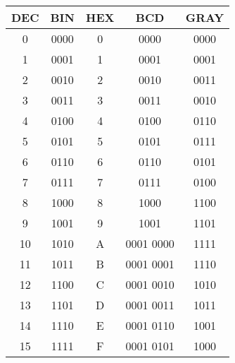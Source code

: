 \begin{multicols}{3}
        \begin{tabular}{|c|c|c|c|c|}
        \hline
        \textbf{DEC} & \textbf{BIN} & \textbf{HEX} & \textbf{BCD} & \textbf{GRAY} \\ \hline
        0            & 0000         & 0            & 0000         & 0000          \\ \hline
        1            & 0001         & 1            & 0001         & 0001          \\ \hline
        2            & 0010         & 2            & 0010         & 0011          \\ \hline
        3            & 0011         & 3            & 0011         & 0010          \\ \hline
        4            & 0100         & 4            & 0100         & 0110          \\ \hline
        5            & 0101         & 5            & 0101         & 0111          \\ \hline
        6            & 0110         & 6            & 0110         & 0101          \\ \hline
        7            & 0111         & 7            & 0111         & 0100          \\ \hline
        8            & 1000         & 8            & 1000         & 1100          \\ \hline
        9            & 1001         & 9            & 1001         & 1101          \\ \hline
        10           & 1010         & A            & 0001 0000    & 1111          \\ \hline
        11           & 1011         & B            & 0001 0001    & 1110          \\ \hline
        12           & 1100         & C            & 0001 0010    & 1010          \\ \hline
        13           & 1101         & D            & 0001 0011    & 1011          \\ \hline
        14           & 1110         & E            & 0001 0110    & 1001          \\ \hline
        15           & 1111         & F            & 0001 0101    & 1000          \\ \hline
        \end{tabular}


\end{multicols}